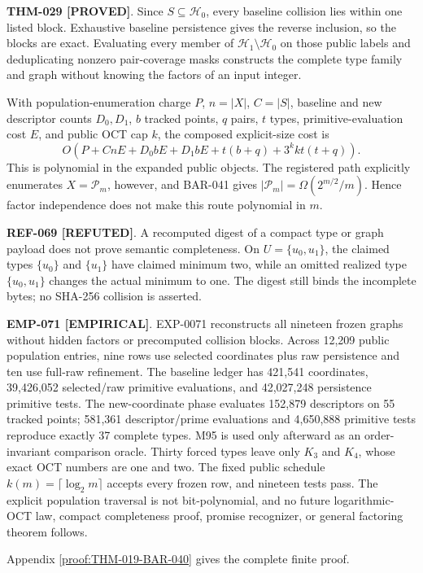 \documentclass[11pt]{article}
\newcommand{\claimstatus}[2]{\textbf{#1 [#2]}}
\begin{document}
\claimstatus{THM-029}{PROVED}. Since \(S\subseteq\mathcal H_0\), every
baseline collision lies within one listed block. Exhaustive baseline
persistence gives the reverse inclusion, so the blocks are exact.
Evaluating every member of
\(\mathcal H_1\setminus\mathcal H_0\) on those public labels and
deduplicating nonzero pair-coverage masks constructs the complete type
family and graph without knowing the factors of an input integer.

With population-enumeration charge \(P\), \(n=|X|\), \(C=|S|\), baseline
and new descriptor counts \(D_0,D_1\), \(b\) tracked points, \(q\) pairs,
\(t\) types, primitive-evaluation cost \(E\), and public OCT cap \(k\), the
composed explicit-size cost is
\[
 O\!\left(
 P+CnE+D_0bE+D_1bE+t(b+q)+3^kkt(t+q)
 \right).
\]
This is polynomial in the expanded public objects. The registered path
explicitly enumerates \(X=\mathcal P_m\), however, and BAR-041 gives
\(|\mathcal P_m|=\Omega(2^{m/2}/m)\). Hence factor independence does not
make this route polynomial in \(m\).

\claimstatus{REF-069}{REFUTED}. A recomputed digest of a compact type or
graph payload does not prove semantic completeness. On
\(U=\{u_0,u_1\}\), the claimed types
\(\{u_0\}\) and \(\{u_1\}\) have claimed minimum two, while an omitted
realized type \(\{u_0,u_1\}\) changes the actual minimum to one. The digest
still binds the incomplete bytes; no SHA-256 collision is asserted.

\claimstatus{EMP-071}{EMPIRICAL}. EXP-0071 reconstructs all nineteen frozen
graphs without hidden factors or precomputed collision blocks. Across
12,209 public population entries, nine rows use selected coordinates plus
raw persistence and ten use full-raw refinement. The baseline ledger has
421,541 coordinates, 39,426,052 selected/raw primitive evaluations, and
42,027,248 persistence primitive tests. The new-coordinate phase evaluates
152,879 descriptors on 55 tracked points; 581,361 descriptor/prime
evaluations and 4,650,888 primitive tests reproduce exactly 37 complete
types. M95 is used only afterward as an order-invariant comparison oracle.
Thirty forced types leave only \(K_3\) and \(K_4\), whose exact OCT numbers
are one and two. The fixed public schedule
\(k(m)=\lceil\log_2m\rceil\) accepts every frozen row, and nineteen tests
pass. The explicit population traversal is not bit-polynomial, and no
future logarithmic-OCT law, compact completeness proof, promise recognizer,
or general factoring theorem follows.

Appendix \ref{proof:THM-019-BAR-040} gives the complete finite proof.
\end{document}
